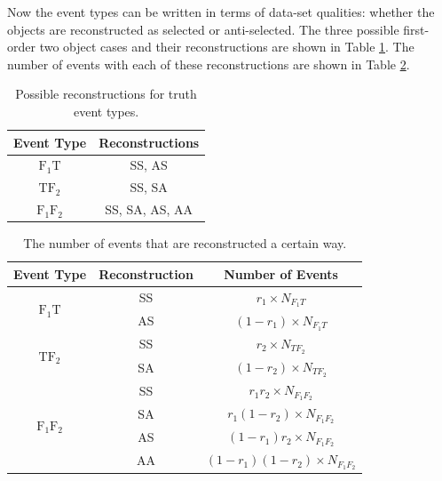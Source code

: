 Now the event types can be written in terms of data-set qualities: whether the objects are reconstructed as selected or anti-selected. The three possible first-order two object cases and their reconstructions are shown in Table \ref{tab:ff_2}. The number of events with each of these reconstructions are shown in Table \ref{tab:ff_3}.\\

\pagebreak

\begin{table}[htb!]
    \centering
    \begin{tabular}{|c|c|}
    \hline
        \textbf{Event Type} & \textbf{Reconstructions} \\
        \hline
        $\text{F}_1\text{T}$ & SS, AS\\
        $\text{TF}_2$ & SS, SA\\
        $\text{F}_1\text{F}_2$ & SS, SA, AS, AA\\
        \hline
    \end{tabular}
    \caption{Possible reconstructions for truth event types.}
    \label{tab:ff_2}
\end{table}

\begin{table}[htb!]
    \centering
    \begin{tabular}{|c|c|c|}
    \hline
    \textbf{Event Type} & \textbf{Reconstruction} & \textbf{Number of Events}\\
    \hline
       \multirow{2}{*}{$\text{F}_1\text{T}$} & SS & $r_1 \times N_{F_1T}$\\
        & AS & $(1-r_1)\times N_{F_1T}$\\
        \hline
        \multirow{2}{*}{$\text{TF}_2$} & SS & $r_2\times N_{TF_2}$\\
        & SA & $(1-r_2)\times N_{TF_2}$\\
        \hline
        \multirow{4}{*}{$\text{F}_1\text{F}_2$} & SS & $r_1 r_2 \times N_{F_1F_2}$\\
        & SA & $r_1(1-r_2)\times N_{F_1F_2}$\\
        & AS & $(1-r_1)r_2\times N_{F_1F_2}$\\
        & AA & $(1-r_1)(1-r_2)\times N_{F_1F_2}$\\
        \hline
    \end{tabular}
    \caption{The number of events that are reconstructed a certain way.}
    \label{tab:ff_3}
\end{table}


